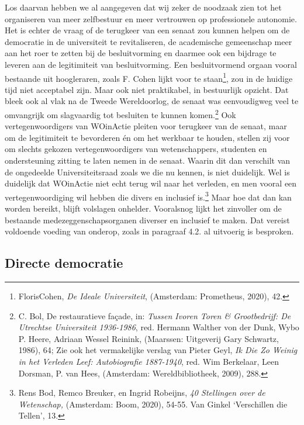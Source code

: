 \documentclass[smallauthor, chapterhaspagenum, nochapterinheader, pagenuminheader,  bigchapnum,medium2, tocpages,  garamond, titleinheader]{jote-book}
\begin{document}
	Los daarvan hebben we al aangegeven dat wij zeker de noodzaak zien tot het organiseren van meer zelfbestuur en meer vertrouwen op professionele autonomie. Het is echter de vraag of de terugkeer van een senaat zou kunnen helpen om de democratie in de universiteit te revitaliseren, de academische gemeenschap meer aan het roer te zetten bij de besluitvorming en daarmee ook een bijdrage te leveren aan de legitimiteit van besluitvorming. Een besluitvormend orgaan vooral bestaande uit hoogleraren, zoals F. Cohen lijkt voor te staan\footnote{FlorisCohen, \emph{De Ideale Universiteit}, (Amsterdam: Prometheus, 2020), 42.}, zou in de huidige tijd niet acceptabel zijn. Maar ook niet praktikabel, in bestuurlijk opzicht. Dat bleek ook al vlak na de Tweede Wereldoorlog, de senaat was eenvoudigweg veel te omvangrijk om slagvaardig tot besluiten te kunnen komen.\footnote{C. Bol, De restauratieve façade, in: \emph{Tussen Ivoren Toren \& Grootbedrijf: De Utrechtse Universiteit 1936-1986}, red. Hermann Walther von der Dunk, Wybo P. Heere, Adriaan Wessel Reinink, (Maarssen: Uitgeverij Gary Schwartz, 1986), 64; Zie ook het vermakelijke verslag van Pieter Geyl, \emph{Ik Die Zo Weinig in het Verleden Leef: Autobiografie 1887-1940}, red. Wim Berkelaar, Leen Dorsman, P. van Hees, (Amsterdam: Wereldbibliotheek, 2009), 288.} Ook vertegenwoordigers van WOinActie pleiten voor terugkeer van de senaat, maar om de legitimiteit te bevorderen én om het werkbaar te houden, stellen zij voor om slechts gekozen vertegenwoordigers van wetenschappers, studenten en ondersteuning zitting te laten nemen in de senaat. Waarin dit dan verschilt van de ongedeelde Universiteitsraad zoals we die nu kennen, is niet duidelijk. Wel is duidelijk dat WOinActie niet echt terug wil naar het verleden, en men vooral een vertegenwoordiging wil hebben die divers en inclusief is.\footnote{Rens Bod, Remco Breuker, en Ingrid Robeijns, \emph{40 Stellingen over de Wetenschap}\emph{, }(Amsterdam: Boom, 2020), 54-55. Van Ginkel ‘Verschillen die Tellen', 13.} Maar hoe dat dan kan worden bereikt, blijft volslagen onhelder. Vooralsnog lijkt het zinvoller om de bestaande medezeggenschapsorganen diverser en inclusief te maken. Dat vereist voldoende voeding van onderop, zoals in paragraaf 4.2. al uitvoerig is besproken.



	\subsection{Directe democratie}
\end{document}

